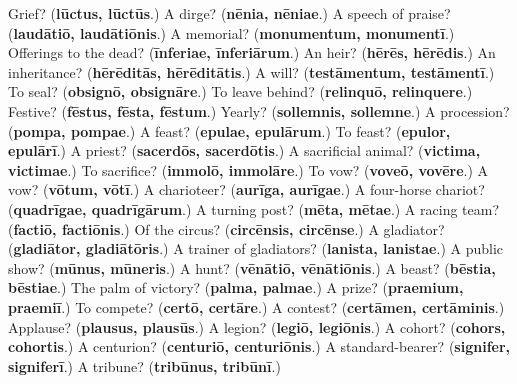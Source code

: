 \begin{tcolorbox}[breakable,colback=teal!4,colframe=teal!35!black,title={Before you move on}]
Grief? (\textbf{lūctus, lūctūs}.) A dirge? (\textbf{nēnia, nēniae}.) A speech of praise? (\textbf{laudātiō, laudātiōnis}.) A memorial? (\textbf{monumentum, monumentī}.) Offerings to the dead? (\textbf{īnferiae, īnferiārum}.) An heir? (\textbf{hērēs, hērēdis}.) An inheritance? (\textbf{hērēditās, hērēditātis}.) A will? (\textbf{testāmentum, testāmentī}.) To seal? (\textbf{obsignō, obsignāre}.) To leave behind? (\textbf{relinquō, relinquere}.) Festive? (\textbf{fēstus, fēsta, fēstum}.) Yearly? (\textbf{sollemnis, sollemne}.) A procession? (\textbf{pompa, pompae}.) A feast? (\textbf{epulae, epulārum}.) To feast? (\textbf{epulor, epulārī}.) A priest? (\textbf{sacerdōs, sacerdōtis}.) A sacrificial animal? (\textbf{victima, victimae}.) To sacrifice? (\textbf{immolō, immolāre}.) To vow? (\textbf{voveō, vovēre}.) A vow? (\textbf{vōtum, vōtī}.) A charioteer? (\textbf{aurīga, aurīgae}.) A four-horse chariot? (\textbf{quadrīgae, quadrīgārum}.) A turning post? (\textbf{mēta, mētae}.) A racing team? (\textbf{factiō, factiōnis}.) Of the circus? (\textbf{circēnsis, circēnse}.) A gladiator? (\textbf{gladiātor, gladiātōris}.) A trainer of gladiators? (\textbf{lanista, lanistae}.) A public show? (\textbf{mūnus, mūneris}.) A hunt? (\textbf{vēnātiō, vēnātiōnis}.) A beast? (\textbf{bēstia, bēstiae}.) The palm of victory? (\textbf{palma, palmae}.) A prize? (\textbf{praemium, praemiī}.) To compete? (\textbf{certō, certāre}.) A contest? (\textbf{certāmen, certāminis}.) Applause? (\textbf{plausus, plausūs}.) A legion? (\textbf{legiō, legiōnis}.) A cohort? (\textbf{cohors, cohortis}.) A centurion? (\textbf{centuriō, centuriōnis}.) A standard-bearer? (\textbf{signifer, signiferī}.) A tribune? (\textbf{tribūnus, tribūnī}.)
\end{tcolorbox}
